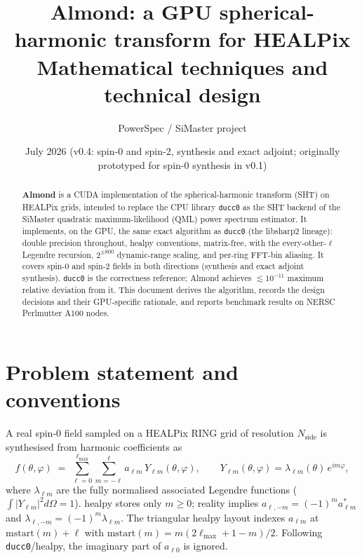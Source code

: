 \documentclass[11pt]{article}
\title{\textbf{Almond}: a GPU spherical-harmonic transform for HEALPix\\
{\large Mathematical techniques and technical design}}
\author{PowerSpec / SiMaster project}
\date{July 2026 (v0.4: spin-0 and spin-2, synthesis and exact adjoint;
originally prototyped for spin-0 synthesis in v0.1)}
\newcommand{\lm}{\lambda_{\ell m}}
\begin{document}
\maketitle

\begin{abstract}
\noindent
\textbf{Almond} is a CUDA implementation of the spherical-harmonic transform
(SHT) on HEALPix grids, intended to replace the CPU library \texttt{ducc0}
as the SHT backend of the SiMaster quadratic maximum-likelihood (QML) power
spectrum estimator.  It implements, on the GPU, the same
exact algorithm as \texttt{ducc0} (the libsharp2 lineage): double precision
throughout, healpy conventions, matrix-free, with the every-other-$\ell$
Legendre recursion, $2^{\pm800}$ dynamic-range scaling, and per-ring FFT-bin
aliasing.  It covers spin-0 and spin-2 fields in both directions
(synthesis and exact adjoint synthesis).  \texttt{ducc0} is the correctness
reference; Almond achieves $\lesssim 10^{-11}$ maximum relative deviation
from it.  This
document derives the algorithm, records the design decisions and their
GPU-specific rationale, and reports benchmark results on NERSC Perlmutter
A100 nodes.
\end{abstract}

\tableofcontents

\section{Problem statement and conventions}

A real spin-0 field sampled on a HEALPix RING grid of resolution
$N_\mathrm{side}$ is synthesised from harmonic coefficients as
\begin{equation}
f(\theta,\varphi) \;=\; \sum_{\ell=0}^{\ell_{\max}} \sum_{m=-\ell}^{\ell}
   a_{\ell m}\, Y_{\ell m}(\theta,\varphi),
\qquad
Y_{\ell m}(\theta,\varphi) = \lm(\theta)\, e^{im\varphi},
\end{equation}
where $\lm$ are the fully normalised associated Legendre functions
($\int |Y_{\ell m}|^2 d\Omega = 1$).  healpy stores only $m \ge 0$; reality
implies $a_{\ell,-m} = (-1)^m a_{\ell m}^{*}$ and
$\lambda_{\ell,-m} = (-1)^m \lm$.  The triangular healpy layout indexes
$a_{\ell m}$ at $\mathrm{mstart}(m) + \ell$ with
$\mathrm{mstart}(m) = m(2\ell_{\max}+1-m)/2$.  Following
\texttt{ducc0}/healpy, the imaginary part of $a_{\ell 0}$ is ignored.
\end{document}
